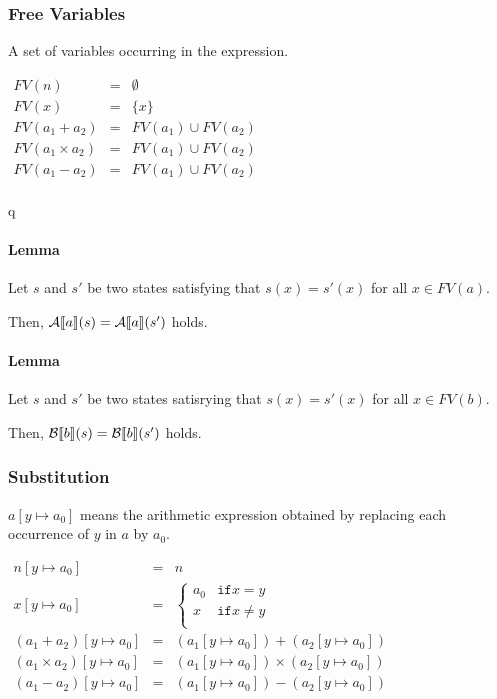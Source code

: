 \subsubsection{Free Variables}

A set of variables occurring in the expression.

\begin{math}
  \begin{array}{rcl}
    FV(n) & = & \emptyset \\
    FV(x) & = & \{ x \} \\
    FV(a_1 + a_2) & = & FV(a_1) \cup FV(a_2) \\
    FV(a_1 \times a_2) & = & FV(a_1) \cup FV(a_2) \\
    FV(a_1 - a_2) & = & FV(a_1) \cup FV(a_2) \\
  \end{array}
\end{math}

q\paragraph{Lemma}

Let $ s $ and $ s' $ be two states satisfying that $ s(x) = s'(x) $
for all $ x \in FV(a) $.

Then, $ \mathcal{A} \llbracket  a  \rrbracket (s) =\mathcal{A} \llbracket  a  \rrbracket (s') $ holds.

\paragraph{Lemma}

Let $ s $ and $ s' $ be two states satisrying that $ s(x) = s'(x) $
for all $ x \in FV(b) $.

Then, $ \mathcal{B} \llbracket  b  \rrbracket (s) = \mathcal{B} \llbracket  b  \rrbracket (s') $
holds.


\subsubsection{Substitution}

$ a [ y \mapsto a_0 ] $ means the arithmetic expression obtained by
replacing each occurrence of $ y $ in $a $ by $ a_0 $.

\begin{math}
  \begin{array}{rcl}
    n[y \mapsto a_0 ] & = & n \\
    x[y \mapsto a_0 ] & = & \begin{cases}
      a_0 & \mathtt{if} x = y \\
      x & \mathtt{if} x \neq y \\
    \end{cases} \\
    (a_1 + a_2)[y \mapsto a_0] & = & (a_1[y \mapsto a_0]) + (a_2[y \mapsto a_0]) \\
    (a_1 \times a_2)[y \mapsto a_0] & = & (a_1[y \mapsto a_0]) \times (a_2[y \mapsto a_0]) \\
    (a_1 - a_2)[y \mapsto a_0] & = & (a_1[y \mapsto a_0]) - (a_2[y \mapsto a_0]) \\
  \end{array}
\end{math}


